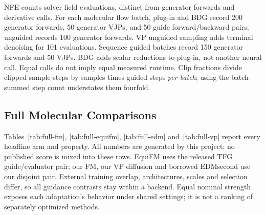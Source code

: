 \documentclass{article}
\begin{document}
NFE counts solver field evaluations, distinct from generator forwards and derivative calls. For each molecular flow batch, plug-in and BDG record 200 generator forwards, 50 generator VJPs, and 50 guide forward/backward pairs; unguided records 100 generator forwards. VP unguided sampling adds terminal denoising for 101 evaluations. Sequence guided batches record 150 generator forwards and 50 VJPs. BDG adds scalar reductions to plug-in, not another neural call. Equal calls do not imply equal measured runtime. Clip fractions divide clipped sample-steps by samples times guided steps \emph{per batch}; using the batch-summed step count understates them fourfold.

\subsection{Full Molecular Comparisons}\label{app:comparisons}
Tables~\ref{tab:full-fm}, \ref{tab:full-equifm}, \ref{tab:full-edm} and~\ref{tab:full-vp} report every headline arm and property. All numbers are generated by this project; no published score is mixed into these rows. EquiFM uses the released TFG guide/evaluator pair; our FM, our VP diffusion and borrowed EDMsecond use our disjoint pair. External training overlap, architectures, scales and selection differ, so all guidance contrasts stay within a backend. Equal nominal strength exposes each adaptation's behavior under shared settings; it is not a ranking of separately optimized methods.
\end{document}
